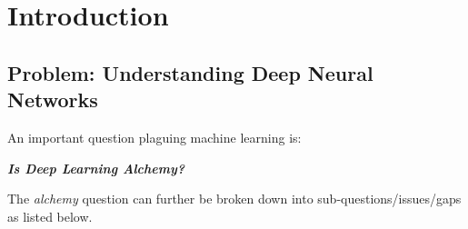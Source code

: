 \documentclass{article}
\begin{document}

\section{Introduction}\label{sec:intro}
\subsection{Problem: Understanding Deep Neural Networks}
An important question plaguing machine learning \cite{BenAli-1,Lecun,BenAli-2,Aliresponse,Mickens} is:
\begin{center}
\textbf{\emph{Is Deep Learning Alchemy?}}
\end{center}
The \emph{alchemy} question can further be broken down into sub-questions/issues/gaps as listed below. 
\end{document}
